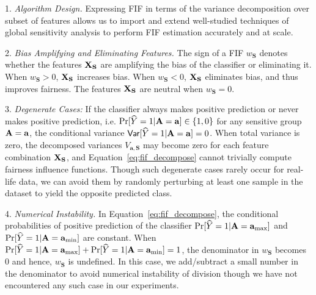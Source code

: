 1. \textit{Algorithm Design.} Expressing FIF in terms of the variance decomposition over subset of features allows us to import and extend well-studied techniques of global sensitivity analysis to perform FIF estimation accurately and at scale.

2. \textit{Bias Amplifying and Eliminating Features.} The sign of a FIF $ w_{\mathbf{S}} $ denotes whether the features $ \mathbf{X}_{\mathbf{S}} $ are amplifying the bias of the classifier or eliminating it. When $ w_{\mathbf{S}} > 0 $, $ \mathbf{X}_{\mathbf{S}} $ increases bias. When $ w_{\mathbf{S}} < 0 $, $ \mathbf{X}_{\mathbf{S}} $ eliminates bias, and thus improves fairness. The features $ \mathbf{X}_{\mathbf{S}} $ are neutral when $ w_{\mathbf{S}} = 0 $.

3. \textit{Degenerate Cases:} If the classifier always makes positive prediction or never makes positive prediction, i.e. $ \Pr[\widehat{Y} = 1 | \mathbf{A} = \mathbf{a}] \in \{1, 0\} $ for any sensitive group $ \mathbf{A} = \mathbf{a} $, the conditional variance $ \mathsf{Var}[\widehat{Y} = 1 | \mathbf{A} = \mathbf{a}]  = 0 $. When total variance is zero, the decomposed variances $V_{\mathbf{a},\mathbf{S}}$ may become zero for each feature combination $\mathbf{X}_\mathbf{S}$, and Equation~\eqref{eq:fif_decompose} cannot trivially compute fairness influence functions. Though such degenerate cases rarely occur for real-life data, we can avoid them by randomly perturbing at least one sample in the dataset to yield the opposite predicted class.

4. \textit{Numerical Instability.} In Equation~\eqref{eq:fif_decompose}, the conditional probabilities of positive prediction of the classifier $ \Pr[\widehat{Y} = 1 | \mathbf{A} = \mathbf{a}_{\max}]  $ and $ \Pr[\widehat{Y} = 1 | \mathbf{A} = \mathbf{a}_{\min}]  $ are constant. When $ \Pr[\widehat{Y} = 1 | \mathbf{A} = \mathbf{a}_{\max}] + \Pr[\widehat{Y} = 1 | \mathbf{A} = \mathbf{a}_{\min}]   = 1 $, the denominator in $ w_{\mathbf{S}} $ becomes $ 0 $ and hence, $ w_{\mathbf{S}} $ is undefined. In this case, we add/subtract a small number in the denominator to avoid numerical instability of division though we have not encountered any such case in our experiments.%





